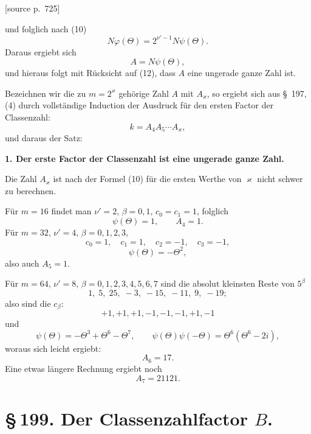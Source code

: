 \documentclass[11pt]{article}
\newcommand{\srcpage}[1]{\par\medskip\noindent\textsf{[source p.~#1]}\par\smallskip}
\begin{document}
\srcpage{725}
und folglich nach (10)
\[
N\varphi(\Theta)=2^{\nu'-1}N\psi(\Theta).
\]
Daraus ergiebt sich
\begin{equation}
A=N\psi(\Theta),
\tag{13}
\end{equation}
und hieraus folgt mit Rücksicht auf (12), dass $A$ eine ungerade ganze Zahl ist.

Bezeichnen wir die zu $m=2^\varkappa$ gehörige Zahl $A$ mit $A_\varkappa$, so ergiebt sich aus \S~197, (4) durch vollständige Induction der Ausdruck für den ersten Factor der Classenzahl:
\begin{equation}
k=A_4A_5\cdots A_\varkappa,
\tag{14}
\end{equation}
und daraus der Satz:
\begin{center}
\textbf{1. Der erste Factor der Classenzahl ist eine ungerade ganze Zahl.}
\end{center}
Die Zahl $A_\varkappa$ ist nach der Formel (10) für die ersten Werthe von $\varkappa$ nicht schwer zu berechnen.

Für $m=16$ findet man $\nu'=2$, $\beta=0,1$, $c_0=c_1=1$, folglich
\[
\psi(\Theta)=1,
\qquad
A_4=1.
\]
Für $m=32$, $\nu'=4$, $\beta=0,1,2,3$,
\[
c_0=1,
\quad c_1=1,
\quad c_2=-1,
\quad c_3=-1,
\]
\[
\psi(\Theta)=-\Theta^2,
\]
also auch $A_5=1$.

Für $m=64$, $\nu'=8$, $\beta=0,1,2,3,4,5,6,7$ sind die absolut kleinsten Reste von $5^\beta$
\[
1,\;5,\;25,\;-3,\;-15,\;-11,\;9,\;-19;
\]
also sind die $c_\beta$:
\[
+1,+1,+1,-1,-1,-1,+1,-1
\]
und
\[
\psi(\Theta)=-\Theta^3+\Theta^6-\Theta^7,
\qquad
\psi(\Theta)\psi(-\Theta)=\Theta^6(\Theta^6-2i),
\]
woraus sich leicht ergiebt:
\[
A_6=17.
\]
Eine etwas längere Rechnung ergiebt noch
\[
A_7=21121.
\]

\section*{\S\,199. Der Classenzahlfactor $B$.}
\end{document}
